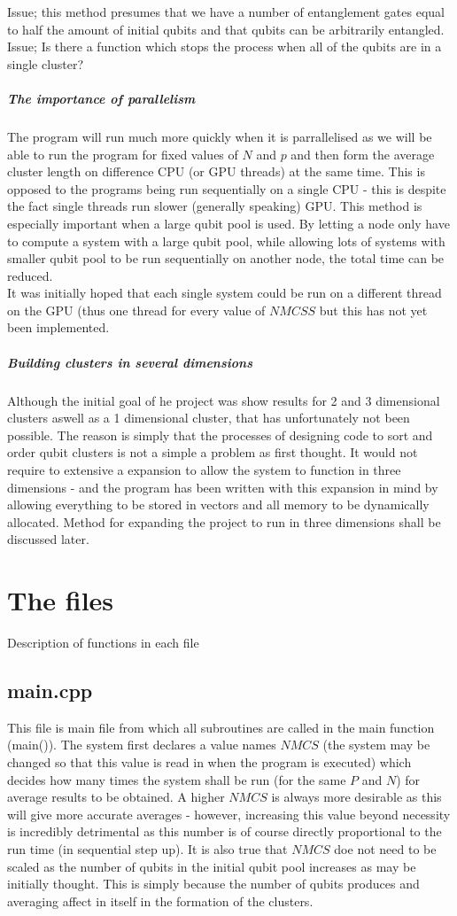 \documentclass{article}
\numberwithin{equation}{section} %
\begin{document}
Issue; this method presumes that we have a number of entanglement gates equal to half the amount of initial qubits and that qubits can be arbitrarily entangled. 
Issue; Is there a function which stops the process when all of the qubits are in a single cluster?

\subparagraph{The importance of parallelism} 
The program will run much more quickly when it is parrallelised as we will be able to run the program for fixed values of $N$ and $p$ and then form the average cluster length on difference CPU (or GPU threads) at the same time. This is opposed to the programs being run sequentially on a single CPU - this is despite the fact single threads run slower (generally speaking) GPU. This method is especially important when a large qubit pool is used. By letting a node only have to compute a system with a large qubit pool, while allowing lots of systems with smaller qubit pool to be run sequentially on another node, the total time can be reduced. \\
It was initially hoped that each single system could be run on a different thread on the GPU (thus one thread for every value of $NMCSS$ but this has not yet been implemented. 

\subparagraph{Building clusters in several dimensions} 
Although the initial goal of he project was show results for 2 and 3 dimensional clusters aswell as a 1 dimensional cluster, that has unfortunately not been possible. The reason is simply that the processes of designing code to sort and order qubit clusters is not a simple a problem as first thought. It would not require to extensive a expansion to allow the system to function in three dimensions - and the program has been written with this expansion in mind by allowing everything to be stored in vectors and all memory to be dynamically allocated. Method for expanding the project to run in three dimensions shall be discussed later. 

\section{The files} Description of functions in each file

\subsection{main.cpp} This file is main file from which all subroutines are called in the main function (main()). The system first declares a value names $NMCS$ (the system may be changed so that this value is read in when the program is executed) which decides how many times the system shall be run (for the same $P$ and $N$) for average results to be obtained. A higher $NMCS$ is always more desirable as this will give more accurate averages - however, increasing this value beyond necessity is incredibly detrimental as this number is of course directly proportional to the run time (in sequential step up). It is also true that $NMCS$ doe not need to be scaled as the number of qubits in the initial qubit pool increases as may be initially thought. This is simply because the number of qubits produces and averaging affect in itself in the formation of the clusters. \\
\end{document}
